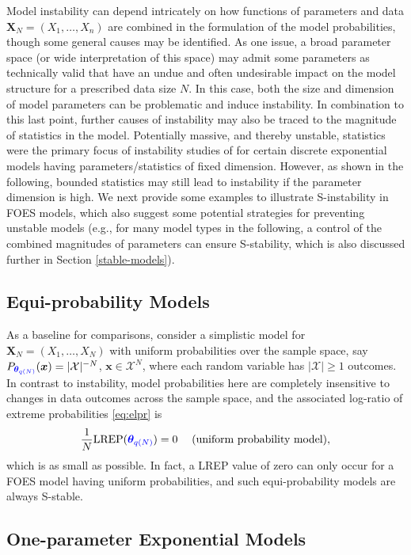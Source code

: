 \documentclass[numbib]{imamat}
\theoremstyle{theorem}
\theoremstyle{lemma}
\theoremstyle{example}
\theoremstyle{corollary}
\theoremstyle{definition}
\theoremstyle{remark}
\theoremstyle{approximation}
\theoremstyle{scheme}
\newcommand{\REP}{\mathrm{LREP}}
\newcommand{\thetaidx}{q(N)}
\newcommand{\thetaN}{\boldsymbol \theta_{\thetaidx}}
\newcommand{\ak}[1]{{\color{blue} #1}}
\begin{document}
Model instability can depend intricately on how functions of parameters and data \(\boldsymbol X_N=(X_1,\ldots,X_n)\) are combined in the formulation of the model probabilities, though some general causes may be identified. As one issue, a broad parameter space (or wide interpretation of this space) may admit some parameters as technically valid that have an undue and often undesirable impact on the model structure for a prescribed data size \(N\). In this case, both the size and dimension of model parameters can be problematic and induce instability. In combination to this last point, further causes of instability may also be traced to the magnitude of statistics in the model. Potentially massive, and thereby unstable, statistics were the primary focus of instability studies of \citet{schweinberger2011instability} for certain discrete exponential models having parameters/statistics of fixed dimension. However, as shown in the following, bounded statistics may still lead to instability if the parameter dimension is high. We next \ak{provide} some examples to illustrate S-instability in FOES models, which also suggest some potential strategies for preventing unstable models \ak{(e.g., for many model types in the following, a control of the combined magnitudes of parameters can ensure S-stability, which is also discussed further in Section \ref{stable-models})}.

\hypertarget{equi-probability-models}{%
\subsection{Equi-probability Models}\label{equi-probability-models}}

As a baseline for comparisons, consider a simplistic model for \(\boldsymbol X_N=(X_1,\ldots,X_N)\) with uniform probabilities over the sample space, say \(P_{\ak{\thetaN}}(\boldsymbol x)= |\mathcal{X}|^{-N}\), \(\boldsymbol x \in \mathcal{X}^N\), where each random variable has \(|\mathcal{X}| \geq 1\) outcomes. In contrast to instability, model probabilities here are completely insensitive to changes in data outcomes across the sample space, and the associated log-ratio of extreme probabilities \eqref{eq:elpr} is
\[
\frac{1}{N} \REP(\ak{\thetaN})=0\quad \;(\text{uniform probability model}),
\]
which is as small as possible. In fact, a LREP value of zero can only occur for a FOES model having uniform probabilities, and such equi-probability models are always S-stable.

\hypertarget{one-param-exp}{%
\subsection{One-parameter Exponential Models}\label{one-param-exp}}
\end{document}
